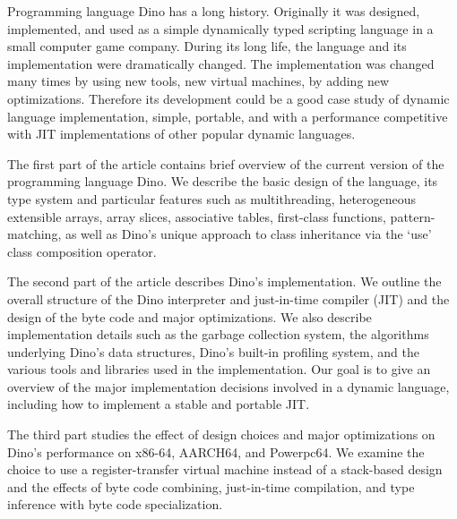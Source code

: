 \documentclass[preprint]{sigplanconf}
\begin{document}
  Programming language Dino has a long history.  Originally it was
designed, implemented, and used as a simple dynamically typed
scripting language in a small computer game company.  During its long
life, the language and its implementation were dramatically changed.
The implementation was changed many times by using new tools, new
virtual machines, by adding new optimizations.  Therefore its
development could be a good case study of dynamic language
implementation, simple, portable, and with a performance competitive
with JIT implementations of other popular dynamic languages.



  The first part of the article contains brief overview of the current
version of the programming language Dino.
We describe the basic design of the language, its type system and particular features
such as multithreading, heterogeneous extensible arrays, array slices, associative tables,
first-class functions, pattern-matching, as well as Dino's unique approach to class
inheritance via the `use' class composition operator.

  The second part of the article describes Dino's implementation.
We outline the overall structure of the Dino interpreter and just-in-time compiler (JIT) and the design of the byte code
and major optimizations. We also describe implementation details such as the garbage collection system, the algorithms underlying Dino's data structures,
Dino's built-in profiling system,
and the various tools and libraries used in the implementation. Our goal is to give an overview of the major implementation decisions
involved in a dynamic language, including how to implement a stable and portable JIT.

  The third part studies the effect of design choices and major
optimizations on Dino's performance on x86-64, AARCH64, and Powerpc64.
We examine the choice to use a register-transfer virtual machine instead of a
stack-based design and the effects of byte code combining, just-in-time compilation,
and type inference with byte code specialization.
\end{document}
